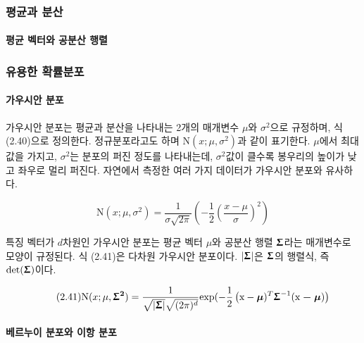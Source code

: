 \documentclass [12pt] {oblivoir}
\let\oldsubsubsection=\subsubsection
\renewcommand{\subsubsection}
{
  \filbreak
  \oldsubsubsection
}
\begin{document}
\subsubsection{평균과 분산}

\paragraph*{평균 벡터와 공분산 행렬}\mbox{}

\subsubsection{유용한 확률분포}

\paragraph*{가우시안 분포}\mbox{}

\vspace{3mm}
\;가우시안 분포는 평균과 분산을 나타내는 2개의 매개변수 $\mu$와 $\sigma^{2}$으로 규정하며,
식 (2.40)으로 정의한다. 정규분포라고도 하며 $\text{N}(x; \mu, \sigma^{2})$과 같이 표기한다. $\mu$에서 최대값을 가지고, $\sigma^{2}$는 분포의 퍼진 정도를 나타내는데,
$\sigma^{2}$값이 클수록 봉우리의 높이가 낮고 좌우로 멀리 퍼진다. 자연에서 측정한 여러 가지 데이터가 가우시안 분포와 유사하다.

\begin{equation} \tag{2.40}
  \text{N}(x; \mu, \sigma^{2}) = \frac{1}{\sigma\sqrt{2\pi}}\left(-\frac{1}{2}\left(\frac{x - \mu}{\sigma}\right)^{2}\right)
\end{equation}

\vspace{3mm}
\;특징 벡터가 $d$차원인 가우시안 분포는 평균 벡터 $\mu$와 공분산 행렬 $\boldsymbol{\Upsigma}$라는 매개변수로 모양이 규정된다. 식 (2.41)은 다차원 가우시안 분포이다.
$|\boldsymbol{\Upsigma}|$은 $\boldsymbol{\Upsigma}$의 행렬식, 즉 $\text{det}(\boldsymbol{\Upsigma})$이다.

\begin{equation} \tag{2.41}
  \text{N}(x; \mu, \boldsymbol{\Upsigma^{2}}) = \frac{1}{\sqrt{|\boldsymbol{\Upsigma}|}\sqrt{(2\pi)^{d}}}\text{exp}(-\frac{1}{2}\left(\boldsymbol{\text{x}} - \boldsymbol{\mu})^{T}\boldsymbol{\Upsigma}^{-1}(\boldsymbol{\text{x} - \mu})\right)
\end{equation}

\paragraph*{베르누이 분포와 이항 분포}\mbox{}
\end{document}
